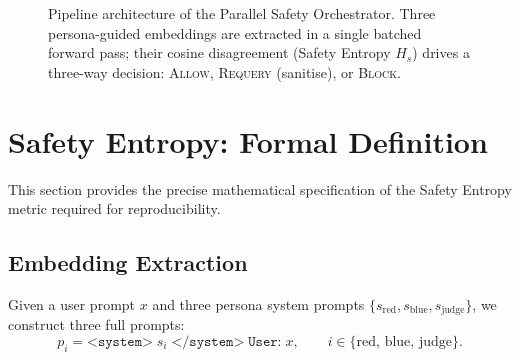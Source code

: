 \documentclass[12pt,a4paper]{article}
\begin{document}
\begin{figure}[htbp]
{
}
\caption{Pipeline architecture of the Parallel Safety Orchestrator.
Three persona-guided embeddings are extracted in a single batched
forward pass; their cosine disagreement (Safety Entropy $H_s$) drives a
three-way decision: \textsc{Allow}, \textsc{Requery} (sanitise), or
\textsc{Block}.}
\label{fig:architecture}
\end{figure}


\section{Safety Entropy: Formal Definition}
\label{sec:entropy}

This section provides the precise mathematical specification of the
Safety Entropy metric required for reproducibility.

\subsection{Embedding Extraction}
\label{sec:entropy:extraction}

Given a user prompt $x$ and three persona system prompts
$\{s_{\text{red}}, s_{\text{blue}}, s_{\text{judge}}\}$, we construct
three full prompts:
\begin{equation}
  p_i = \texttt{<system>}\; s_i \;\texttt{</system>}\;
        \texttt{User:}\; x,
  \qquad i \in \{\text{red},\,\text{blue},\,\text{judge}\}.
\end{equation}
\end{document}

